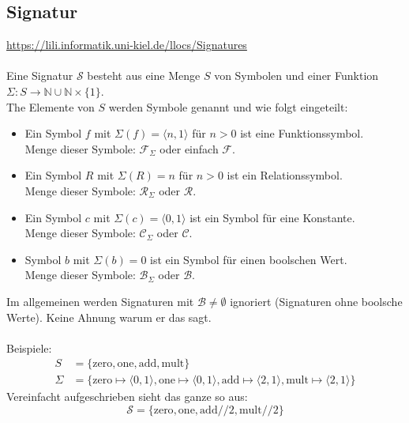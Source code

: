 \documentclass{article}
\begin{document}
    \subsection{Signatur}
    \url{https://lili.informatik.uni-kiel.de/llocs/Signatures}\\\\
    Eine Signatur $\mathcal S$ besteht aus eine Menge $S$ von Symbolen und einer Funktion $\Sigma \colon S \to \mathbb N \cup \mathbb N \times \{1\}$.\\
    The Elemente von $S$ werden Symbole genannt und wie folgt eingeteilt:
    \begin{itemize}
        \item Ein Symbol $f$ mit $\Sigma(f) = \langle n, 1\rangle$ für $n > 0$ ist eine Funktionssymbol.\\
        Menge dieser Symbole: $\mathcal F_\Sigma$ oder einfach $\mathcal F$.
        \item Ein Symbol $R$ mit $\Sigma(R) = n$ für $n > 0$ ist ein Relationssymbol.\\
        Menge dieser Symbole: $\mathcal R_\Sigma$ oder $\mathcal R$.
        \item Ein Symbol $c$ mit $\Sigma(c) = \langle 0,1\rangle$ ist ein Symbol für eine Konstante.\\
        Menge dieser Symbole: $\mathcal C_\Sigma$ oder $\mathcal C$.
        \item Symbol $b$ mit $\Sigma(b) = 0$ ist ein Symbol für einen boolschen Wert. \\
        Menge dieser Symbole: $\mathcal B_\Sigma$ oder $\mathcal B$.
    \end{itemize}
    Im allgemeinen werden Signaturen mit $\mathcal B \neq \emptyset$ ignoriert (Signaturen ohne boolsche Werte). Keine Ahnung warum er das sagt.\\\\
    Beispiele:
    \begin{align*}
        S &= \{\text{zero}, \text{one}, \text{add}, \text{mult}\}\\
        \Sigma &= \{\text{zero} \mapsto \langle 0,1\rangle, \text{one} \mapsto \langle 0,1\rangle, \text{add} \mapsto \langle 2,1\rangle, \text{mult} \mapsto \langle 2,1\rangle\}
    \end{align*}
   Vereinfacht aufgeschrieben sieht das ganze so aus:
    $$\mathcal S = \{\text{zero}, \text{one}, \text{add}/\!/2, \text{mult}/\!/2\}$$
\end{document}
